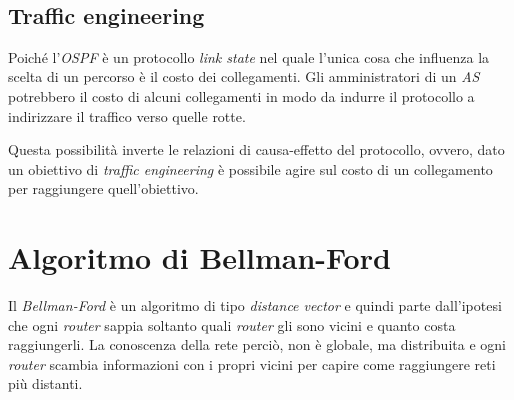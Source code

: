 \begin{figure}[h!]
    \centering
    \hfill
    \\
\end{figure}

\subsection{Traffic engineering}
Poiché l'\emph{OSPF} è un protocollo \emph{link state} nel quale l'unica cosa che
influenza la scelta di un percorso è il costo dei collegamenti. Gli amministratori
di un \emph{AS} potrebbero  il costo di alcuni collegamenti in
modo da indurre il protocollo a indirizzare il traffico verso quelle rotte.

Questa possibilità inverte le relazioni di causa-effetto del protocollo, ovvero,
dato un obiettivo di \emph{traffic engineering} è possibile agire sul costo di
un collegamento per raggiungere quell'obiettivo.

\section{Algoritmo di Bellman-Ford}
Il \emph{Bellman-Ford} è un algoritmo di tipo \emph{distance vector} e quindi
parte dall'ipotesi che ogni \emph{router} sappia soltanto quali \emph{router} gli
sono vicini e quanto costa raggiungerli. La conoscenza della rete perciò, non è
globale, ma distribuita e ogni \emph{router} scambia informazioni con i propri
vicini per capire come raggiungere reti più distanti.

